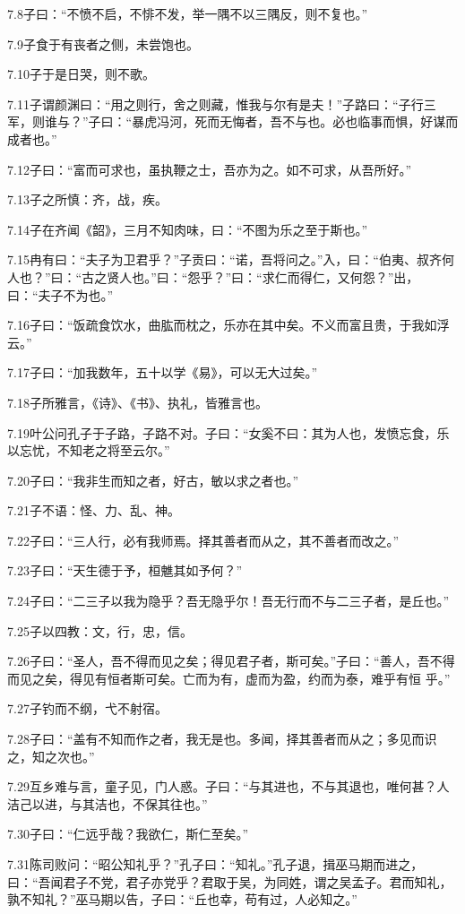 \documentclass[a4paper,12pt,UTF8,twoside]{ctexbook}
\begin{document}
7.8子曰：“不愤不启，不悱不发，举一隅不以三隅反，则不复也。”

7.9子食于有丧者之侧，未尝饱也。

7.10子于是日哭，则不歌。

7.11子谓颜渊曰：“用之则行，舍之则藏，惟我与尔有是夫！”子路曰：“子行三军，则谁与？”子曰：“暴虎冯河，死而无悔者，吾不与也。必也临事而惧，好谋而成者也。”

7.12子曰：“富而可求也，虽执鞭之士，吾亦为之。如不可求，从吾所好。”

7.13子之所慎：齐，战，疾。

7.14子在齐闻《韶》，三月不知肉味，曰：“不图为乐之至于斯也。”

7.15冉有曰：“夫子为卫君乎？”子贡曰：“诺，吾将问之。”入，曰：“伯夷、叔齐何人也？”曰：“古之贤人也。”曰：“怨乎？”曰：“求仁而得仁，又何怨？”出，曰：“夫子不为也。”

7.16子曰：“饭疏食饮水，曲肱而枕之，乐亦在其中矣。不义而富且贵，于我如浮云。”

7.17子曰：“加我数年，五十以学《易》，可以无大过矣。”

7.18子所雅言，《诗》、《书》、执礼，皆雅言也。

7.19叶公问孔子于子路，子路不对。子曰：“女奚不曰：其为人也，发愤忘食，乐以忘忧，不知老之将至云尔。”

7.20子曰：“我非生而知之者，好古，敏以求之者也。”

7.21子不语：怪、力、乱、神。

7.22子曰：“三人行，必有我师焉。择其善者而从之，其不善者而改之。”

7.23子曰：“天生德于予，桓魋其如予何？”

7.24子曰：“二三子以我为隐乎？吾无隐乎尔！吾无行而不与二三子者，是丘也。”

7.25子以四教：文，行，忠，信。

7.26子曰：“圣人，吾不得而见之矣；得见君子者，斯可矣。”子曰：“善人，吾不得而见之矣，得见有恒者斯可矣。亡而为有，虚而为盈，约而为泰，难乎有恒
乎。”

7.27子钓而不纲，弋不射宿。

7.28子曰：“盖有不知而作之者，我无是也。多闻，择其善者而从之；多见而识之，知之次也。”

7.29互乡难与言，童子见，门人惑。子曰：“与其进也，不与其退也，唯何甚？人洁己以进，与其洁也，不保其往也。”

7.30子曰：“仁远乎哉？我欲仁，斯仁至矣。”

7.31陈司败问：“昭公知礼乎？”孔子曰：“知礼。”孔子退，揖巫马期而进之，曰：“吾闻君子不党，君子亦党乎？君取于吴，为同姓，谓之吴孟子。君而知礼，
孰不知礼？”巫马期以告，子曰：“丘也幸，苟有过，人必知之。”
\end{document}
